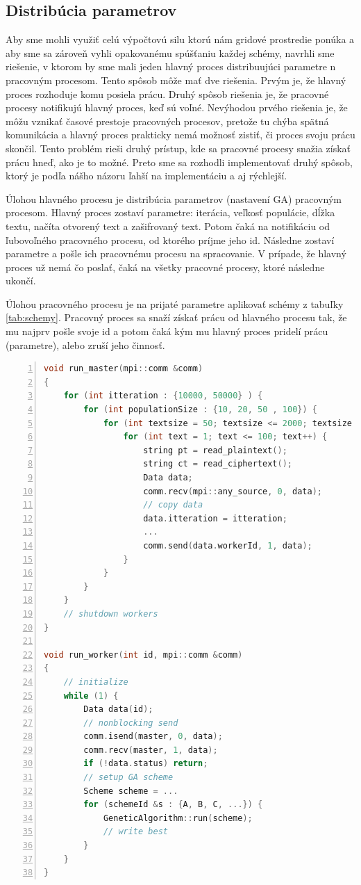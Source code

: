 \subsection{Distribúcia parametrov}
Aby sme mohli využiť celú výpočtovú silu ktorú nám gridové prostredie ponúka a aby sme sa zároveň vyhli opakovanému spúšťaniu každej schémy,
navrhli sme riešenie, v ktorom by sme mali jeden hlavný proces distribuujúci parametre n pracovným procesom.
Tento spôsob môže mať dve riešenia. Prvým je, že hlavný proces rozhoduje komu posiela prácu. Druhý spôsob riešenia je, že pracovné procesy
notifikujú hlavný proces, keď sú voľné. Nevýhodou prvého riešenia je, že môžu vznikať časové prestoje pracovných procesov,
pretože tu chýba spätná komunikácia a hlavný proces prakticky nemá možnosť zistiť, či proces svoju prácu skončil.
Tento problém rieši druhý prístup, kde sa pracovné procesy snažia získať prácu hneď, ako je to možné.
Preto sme sa rozhodli implementovať druhý spôsob, ktorý je podľa nášho názoru ľahší na implementáciu a aj rýchlejší.

Úlohou hlavného procesu je distribúcia parametrov (nastavení GA) pracovným procesom. Hlavný proces zostaví parametre: iterácia, veľkosť populácie, dĺžka textu,
načíta otvorený text a zašifrovaný text. Potom čaká na notifikáciu od ľubovoľného pracovného procesu, od ktorého príjme jeho id.
Následne zostaví parametre a pošle ich pracovnému procesu na spracovanie.
V prípade, že hlavný proces už nemá čo poslať, čaká na všetky pracovné procesy, ktoré následne ukončí.

Úlohou pracovného procesu je na prijaté parametre aplikovať schémy z tabuľky \ref{tab:schemy}.
Pracovný proces sa snaží získať prácu od hlavného procesu tak,
že mu najprv pošle svoje id a potom čaká kým mu hlavný proces pridelí prácu (parametre), alebo zruší jeho činnosť.

\begin{lstlisting}[language=c++, caption={Pseudokód ditribúcie parametrov GA}, numbers=left]
void run_master(mpi::comm &comm)
{
    for (int itteration : {10000, 50000} ) {
        for (int populationSize : {10, 20, 50 , 100}) {
            for (int textsize = 50; textsize <= 2000; textsize += 50) {
                for (int text = 1; text <= 100; text++) {
                    string pt = read_plaintext();
                    string ct = read_ciphertext();
                    Data data;
                    comm.recv(mpi::any_source, 0, data);
                    // copy data
                    data.itteration = itteration;
                    ...
                    comm.send(data.workerId, 1, data);
                }
            }
        } 
    }
    // shutdown workers
}

void run_worker(int id, mpi::comm &comm)
{
    // initialize
    while (1) {
        Data data(id);
        // nonblocking send 
        comm.isend(master, 0, data);
        comm.recv(master, 1, data);
        if (!data.status) return;
        // setup GA scheme
        Scheme scheme = ...
        for (schemeId &s : {A, B, C, ...}) {
            GeneticAlgorithm::run(scheme);
            // write best
        }
    }
}
\end{lstlisting}

